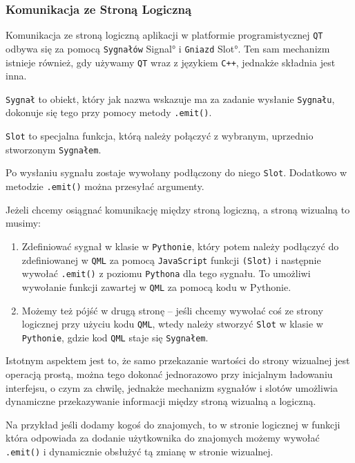 \subsubsection{Komunikacja ze Stroną Logiczną}
\label{sec:KomunikacjaZeStronaLogiczna}
Komunikacja ze stroną logiczną aplikacji w platformie programistycznej \texttt{QT} odbywa się za pomocą \texttt{Sygnałów} \ang{Signal} i \texttt{Gniazd} \ang{Slot}. Ten sam mechanizm istnieje również, gdy używamy \texttt{QT} wraz z językiem \texttt{C++}, jednakże składnia jest inna. 

\texttt{Sygnał} to obiekt, który jak nazwa wskazuje ma za zadanie wysłanie \texttt{Sygnału},
dokonuje się tego przy pomocy metody \texttt{.emit()}.

\texttt{Slot} to specjalna funkcja, którą należy połączyć z wybranym, uprzednio stworzonym \texttt{Sygnałem}.

Po wysłaniu sygnału zostaje wywołany podłączony do niego \texttt{Slot}. Dodatkowo w metodzie \texttt{.emit()} można przesyłać argumenty.

Jeżeli chcemy osiągnać komunikację między stroną logiczną, a stroną wizualną to musimy:

\begin{enumerate}
    \item Zdefiniować sygnał w klasie w \texttt{Pythonie}, który potem należy podłączyć do zdefiniowanej w \texttt{QML} za pomocą \texttt{JavaScript} funkcji \texttt{(Slot)} i następnie wywołać \texttt{.emit()} z poziomu \texttt{Pythona} dla tego sygnału. To umożliwi wywołanie funkcji zawartej w \texttt{QML} za pomocą kodu w Pythonie.
    \item Możemy też pójść w drugą stronę – jeśli chcemy wywołać coś ze strony logicznej przy użyciu kodu \texttt{QML}, wtedy należy stworzyć \texttt{Slot} w klasie w \texttt{Pythonie}, gdzie kod \texttt{QML} staje się \texttt{Sygnałem}.
\end{enumerate}

Istotnym aspektem jest to, że samo przekazanie wartości do strony wizualnej jest operacją prostą, można tego dokonać jednorazowo przy inicjalnym ładowaniu interfejsu, o czym za chwilę, jednakże mechanizm sygnałów i slotów umożliwia dynamiczne przekazywanie informacji między stroną wizualną a logiczną.

Na przykład jeśli dodamy kogoś do znajomych, to w stronie logicznej w funkcji która odpowiada za dodanie użytkownika do znajomych możemy wywołać \texttt{.emit()} i dynamicznie obsłużyć tą zmianę w stronie wizualnej.

